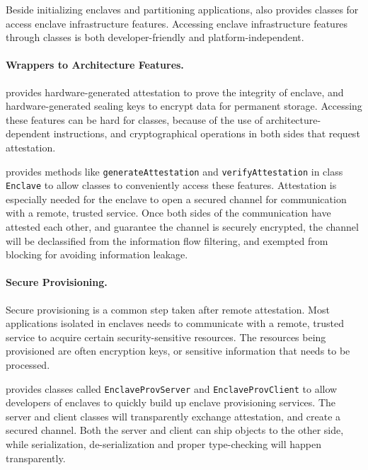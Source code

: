 

Beside initializing enclaves and partitioning \java{} applications,
\sysname{} also provides classes for access enclave infrastructure features.
Accessing enclave infrastructure features through classes
is both developer-friendly and platform-independent.

\paragraph{Wrappers to Architecture Features.}
\intel{} \sgx{} provides hardware-generated attestation
to prove the integrity of enclave,
and hardware-generated sealing keys
to encrypt data for permanent storage.
Accessing these features can be hard for \java{} classes,
because of the use of architecture-dependent instructions,
and cryptographical operations in both sides that request attestation.

\sysname{} provides methods like {\tt generateAttestation}
and {\tt verifyAttestation} in class {\tt Enclave}
to allow \java{} classes to conveniently access these features.
Attestation is especially needed for the enclave to open
a secured channel for communication with a remote, trusted service.
Once both sides of the communication have attested each other,
and guarantee the channel is securely encrypted,
the channel will be declassified from the information flow filtering,
and exempted from blocking for avoiding information leakage.

\paragraph{Secure Provisioning.}
Secure provisioning is a common step taken after remote attestation.
Most applications isolated in enclaves
needs to communicate with a remote, trusted service
to acquire certain security-sensitive resources.
The resources being provisioned are often encryption keys,
or sensitive information that needs to be processed.

\sysname{} provides classes called {\tt EnclaveProvServer}
and {\tt EnclaveProvClient}
to allow developers of enclaves to quickly build up
enclave provisioning services.
The server and client classes will transparently exchange attestation,
and create a secured channel.
Both the server and client can ship \java{} objects
to the other side,
while serialization, de-serialization and proper type-checking
will happen transparently.

